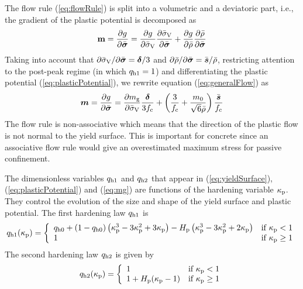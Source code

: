 \documentclass[a4paper]{article}
\newcommand{\mbf}[1]{\mbox{\boldmath$#1$}}
\begin{document}
The flow rule (\ref{eq:flowRule}) is split into a volumetric and a deviatoric part, i.e., the gradient of the plastic potential is decomposed as
%
\begin{equation}\label{eq:generalFlow}
\mathbf{m} = \dfrac{\partial g}{\partial \bar{\boldsymbol{\sigma}} } = \frac{\partial g}{\partial \bar{\sigma}_{\rm V}} \frac{\partial \bar{\sigma}_{\rm V}}{\partial \bar{\boldsymbol{\sigma}}} + \frac{\partial g}{\partial \bar{\rho}} \frac{\partial \bar{\rho} }{\partial \bar{\boldsymbol{\sigma}}}
\end{equation}
Taking into account that $\partial\bar{\sigma}_{\rm V}/\partial\bar{\boldsymbol{\sigma}}=\boldsymbol{\delta}/3$ and $\partial\bar{\rho}/\partial\bar{\boldsymbol{\sigma}}=\bar{\mbf{s}}/\bar\rho$, restricting attention to the post-peak regime (in which $q_{\rm h1} = 1$) and differentiating the plastic potential (\ref{eq:plasticPotential}), we rewrite equation (\ref{eq:generalFlow}) as
\begin{equation}\label{eq:detailedFlow}
\mbf{m} = \dfrac{\partial g}{\partial \bar{\boldsymbol{\sigma}}} =  \frac{{\partial}{m_{\rm g}}}{{\partial}{\bar{\sigma}_{\rm V}}} \frac{\boldsymbol{\delta}}{3f_{\rm c}} 
 + \left(\frac{3}{f_{\rm c}} + \frac{m_0}{\sqrt{6}\bar\rho} \right)\frac{\bar{\mbf{s}}}{f_{\rm c}}
\end{equation}
The flow rule is non-associative which means that the direction of the plastic flow is not normal to the yield surface. This is important for concrete since an associative flow rule would give an overestimated maximum stress for passive confinement. 

The dimensionless variables $q_{\rm h1}$ and $q_{\rm h2}$ that appear in (\ref{eq:yieldSurface}), (\ref{eq:plasticPotential}) and (\ref{eq:mg}) are functions of the hardening variable $\kappa_{\rm p}$. They control the evolution of the size and shape of the yield surface and plastic potential. 
The first hardening law $q_{\rm h1}$ is
%
\begin{equation} \label{eq:hardeningLawOne}
q_{\rm h1}(\kappa_{\rm p}) = 
\left \{ \begin{array}{ll} q_{\rm h0} + \left(1-q_{\rm h0}\right) \left( \kappa_{\rm p}^3 - 3 \kappa_{\rm p}^2 + 3 \kappa_{\rm p} \right) - H_{\rm p} \left(\kappa_{\rm p}^3 - 3 \kappa_{\rm p}^2 + 2 \kappa_{\rm p}\right) & \mbox{if $\kappa_{\rm p} < 1$} \\
1 & \mbox{if $\kappa_{\rm p} \ge 1$}
\end{array}
\right.
\end{equation}
%
The second hardening law $q_{\rm h2}$ is given by
\begin{equation} \label{eq:hardeningLawTwo}
q_{\rm h2}(\kappa_{\rm p}) = \left \{ \begin{array}{ll} 1 & \mbox{if $\kappa_{\rm p} < 1$} \\
1 + H_{\rm p} (\kappa_{\rm p} - 1)  & \mbox{if $\kappa_{\rm p} \ge 1$}
\end{array}
\right.
\end{equation}
\end{document}
